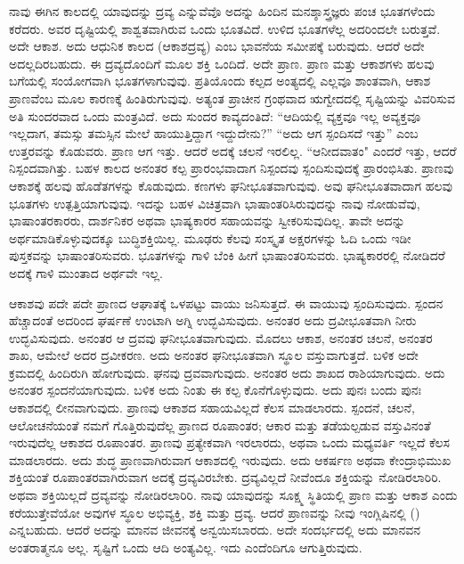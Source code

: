 ನಾವು ಈಗಿನ ಕಾಲದಲ್ಲಿ ಯಾವುದನ್ನು ದ್ರವ್ಯ ಎನ್ನುವೆವೊ ಅದನ್ನು ಹಿಂದಿನ ಮನಶ್ಶಾಸ್ತ್ರಜ್ಞರು ಪಂಚ ಭೂತಗಳೆಂದು ಕರೆದರು. ಅವರ ದೃಷ್ಟಿಯಲ್ಲಿ ಶಾಶ್ವತವಾಗಿರುವ ಒಂದು ಭೂತವಿದೆ. ಉಳಿದ ಭೂತಗಳೆಲ್ಲ ಅದರಿಂದಲೇ ಬರುತ್ತವೆ. ಅದೇ ಆಕಾಶ. ಅದು ಆಧುನಿಕ ಕಾಲದ  (ಆಕಾಶದ್ರವ್ಯ) ಎಂಬ ಭಾವನೆಯ ಸಮೀಪಕ್ಕೆ ಬರುವುದು. ಆದರೆ ಅದೇ ಅದಲ್ಲದಿರಬಹುದು. ಈ ದ್ರವ್ಯದೊಂದಿಗೆ ಮೂಲ ಶಕ್ತಿ ಒಂದಿದೆ. ಅದೇ ಪ್ರಾಣ. ಪ್ರಾಣ ಮತ್ತು ಆಕಾಶಗಳು ಹಲವು ಬಗೆಯಲ್ಲಿ ಸಂಯೋಗವಾಗಿ ಭೂತಗಳಾಗುವುವು. ಪ್ರತಿಯೊಂದು ಕಲ್ಪದ ಅಂತ್ಯದಲ್ಲಿ ಎಲ್ಲವೂ ಶಾಂತವಾಗಿ, ಆಕಾಶ ಪ್ರಾಣವೆಂಬ ಮೂಲ ಕಾರಣಕ್ಕೆ ಹಿಂತಿರುಗುವುವು. ಅತ್ಯಂತ ಪ್ರಾಚೀನ ಗ್ರಂಥವಾದ ಋಗ್ವೇದದಲ್ಲಿ ಸೃಷ್ಟಿಯನ್ನು ವಿವರಿಸುವ ಅತಿ ಸುಂದರವಾದ ಒಂದು ಮಂತ್ರವಿದೆ. ಅದು ಸುಂದರ ಕಾವ್ಯದಂತಿದೆ: “ಆದಿಯಲ್ಲಿ ವ್ಯಕ್ತವೂ ಇಲ್ಲ ಅವ್ಯಕ್ತವೂ ಇಲ್ಲದಾಗ, ತಮಸ್ಸು ತಮಸ್ಸಿನ ಮೇಲೆ ಹಾಯುತ್ತಿದ್ದಾಗ ಇದ್ದುದೇನು?” “ಅದು ಆಗ ಸ್ಪಂದಿಸದೆ ಇತ್ತು” ಎಂಬ ಉತ್ತರವನ್ನು ಕೊಡುವರು. ಪ್ರಾಣ ಆಗ ಇತ್ತು. ಆದರೆ ಅದಕ್ಕೆ ಚಲನೆ ಇರಲಿಲ್ಲ. “ಆನೀದವಾತಂ" ಎಂದರೆ ಇತ್ತು, ಆದರೆ ನಿಸ್ಪಂದವಾಗಿತ್ತು. ಬಹಳ ಕಾಲದ ಅನಂತರ ಕಲ್ಪ ಪ್ರಾರಂಭವಾದಾಗ ನಿಸ್ಪಂದವು ಸ್ಪಂದಿಸುವುದಕ್ಕೆ ಪ್ರಾರಂಭಿಸಿತು. ಪ್ರಾಣವು ಆಕಾಶಕ್ಕೆ ಹಲವು ಹೊಡೆತಗಳನ್ನು ಕೊಡುವುದು. ಕಣಗಳು ಘನೀಭೂತವಾಗುವುವು. ಅವು ಘನೀಭೂತವಾದಾಗ ಹಲವು ಭೂತಗಳು ಉತ್ಪತ್ತಿಯಾಗುವುವು. ಇದನ್ನು ಬಹಳ ವಿಚಿತ್ರವಾಗಿ ಭಾಷಾಂತರಿಸಿರುವುದನ್ನು ನಾವು ನೋಡುವೆವು, ಭಾಷಾಂತರಕಾರರು, ದಾರ್ಶನಿಕರ ಅಥವಾ ಭಾಷ್ಯಕಾರರ ಸಹಾಯವನ್ನು ಸ್ವೀಕರಿಸುವುದಿಲ್ಲ. ತಾವೇ ಅದನ್ನು ಅರ್ಥಮಾಡಿಕೊಳ್ಳುವುದಕ್ಕೂ ಬುದ್ಧಿಶಕ್ತಿಯಿಲ್ಲ. ಮೂಢರು ಕೆಲವು ಸಂಸ್ಕೃತ ಅಕ್ಷರಗಳನ್ನು ಓದಿ ಒಂದು ಇಡೀ ಪುಸ್ತಕವನ್ನು ಭಾಷಾಂತರಿಸುವರು. ಭೂತಗಳನ್ನು ಗಾಳಿ ಬೆಂಕಿ ಹೀಗೆ ಭಾಷಾಂತರಿಸುವರು. ಭಾಷ್ಯಕಾರರಲ್ಲಿ ನೋಡಿದರೆ ಅದಕ್ಕೆ ಗಾಳಿ ಮುಂತಾದ ಅರ್ಥವೇ ಇಲ್ಲ.

ಆಕಾಶವು ಪದೇ ಪದೇ ಪ್ರಾಣದ ಆಘಾತಕ್ಕೆ ಒಳಪಟ್ಟು ವಾಯು ಜನಿಸುತ್ತದೆ. ಈ ವಾಯುವು ಸ್ಪಂದಿಸುವುದು. ಸ್ಪಂದನ ಹೆಚ್ಚಾದಂತೆ ಅದರಿಂದ ಘರ್ಷಣೆ ಉಂಟಾಗಿ ಅಗ್ನಿ ಉದ್ಭವಿಸುವುದು. ಅನಂತರ ಅದು ದ್ರವೀಭೂತವಾಗಿ ನೀರು ಉದ್ಭವಿಸುವುದು. ಅನಂತರ ಆ ದ್ರವವು ಘನೀಭೂತವಾಗುವುದು. ಮೊದಲು ಆಕಾಶ, ಅನಂತರ ಚಲನೆ, ಅನಂತರ ಶಾಖ, ಆಮೇಲೆ ಅದರ ದ್ರವೀಕರಣ. ಅದು ಅನಂತರ ಘನೀಭೂತವಾಗಿ ಸ್ಥೂಲ ವಸ್ತುವಾಗುತ್ತದೆ. ಬಳಿಕ ಅದೇ ಕ್ರಮದಲ್ಲಿ ಹಿಂದಿರುಗಿ ಹೋಗುವುದು. ಘನವು ದ್ರವವಾಗುವುದು. ಅನಂತರ ಅದು ಶಾಖದ ರಾಶಿಯಾಗುವುದು. ಅದು ಅನಂತರ ಸ್ಪಂದನೆಯಾಗುವುದು. ಬಳಿಕ ಅದು ನಿಂತು ಈ ಕಲ್ಪ ಕೊನೆಗೊಳ್ಳುವುದು. ಅದು ಪುನಃ ಬಂದು ಪುನಃ ಆಕಾಶದಲ್ಲಿ ಲೀನವಾಗುವುದು. ಪ್ರಾಣವು ಆಕಾಶದ ಸಹಾಯವಿಲ್ಲದೆ ಕೆಲಸ ಮಾಡಲಾರದು. ಸ್ಪಂದನೆ, ಚಲನೆ, ಆಲೋಚನೆಯಂತೆ ನಮಗೆ ಗೊತ್ತಿರುವುದೆಲ್ಲ ಪ್ರಾಣದ ರೂಪಾಂತರ; ಆಕಾರ ಮತ್ತು ತಡೆಯಲ್ಪಡುವ ವಸ್ತುವಿನಂತೆ ಇರುವುದೆಲ್ಲ ಆಕಾಶದ ರೂಪಾಂತರ. ಪ್ರಾಣವು ಪ್ರತ್ಯೇಕವಾಗಿ ಇರಲಾರದು, ಅಥವಾ ಒಂದು ಮಧ್ಯವರ್ತಿ ಇಲ್ಲದೆ ಕೆಲಸ ಮಾಡಲಾರದು. ಅದು ಶುದ್ಧ ಪ್ರಾಣವಾಗಿರುವಾಗ ಆಕಾಶದಲ್ಲಿ ಇರುವುದು. ಅದು ಆಕರ್ಷಣ ಅಥವಾ ಕೇಂದ್ರಾಭಿಮುಖ ಶಕ್ತಿಯಂತೆ ರೂಪಾಂತರವಾಗಿರುವಾಗ ಅದಕ್ಕೆ ದ್ರವ್ಯವಿರಬೇಕು. ದ್ರವ್ಯವಿಲ್ಲದೆ ನೀವೆಂದೂ ಶಕ್ತಿಯನ್ನು ನೋಡಿರಲಾರಿರಿ. ಅಥವಾ ಶಕ್ತಿಯಿಲ್ಲದೆ ದ್ರವ್ಯವನ್ನು ನೋಡಿರಲಾರಿರಿ. ನಾವು ಯಾವುದನ್ನು ಸೂಕ್ಷ್ಮ ಸ್ಥಿತಿಯಲ್ಲಿ ಪ್ರಾಣ ಮತ್ತು ಆಕಾಶ ಎಂದು ಕರೆಯುತ್ತೇವೆಯೋ ಅವುಗಳ ಸ್ಥೂಲ ಅಭಿವ್ಯಕ್ತಿ, ಶಕ್ತಿ ಮತ್ತು ದ್ರವ್ಯ. ಆದರೆ ಪ್ರಾಣವನ್ನು ನೀವು ಇಂಗ್ಲಿಷಿನಲ್ಲಿ () ಎನ್ನಬಹುದು. ಆದರೆ ಅದನ್ನು ಮಾನವ ಜೀವನಕ್ಕೆ ಅನ್ವಯಿಸಬಾರದು. ಅದೇ ಸಂದರ್ಭದಲ್ಲಿ ಅದು ಮಾನವನ ಅಂತರಾತ್ಮನೂ ಅಲ್ಲ. ಸೃಷ್ಟಿಗೆ ಒಂದು ಆದಿ ಅಂತ್ಯವಿಲ್ಲ. ಇದು ಎಂದೆಂದಿಗೂ ಆಗುತ್ತಿರುವುದು.

